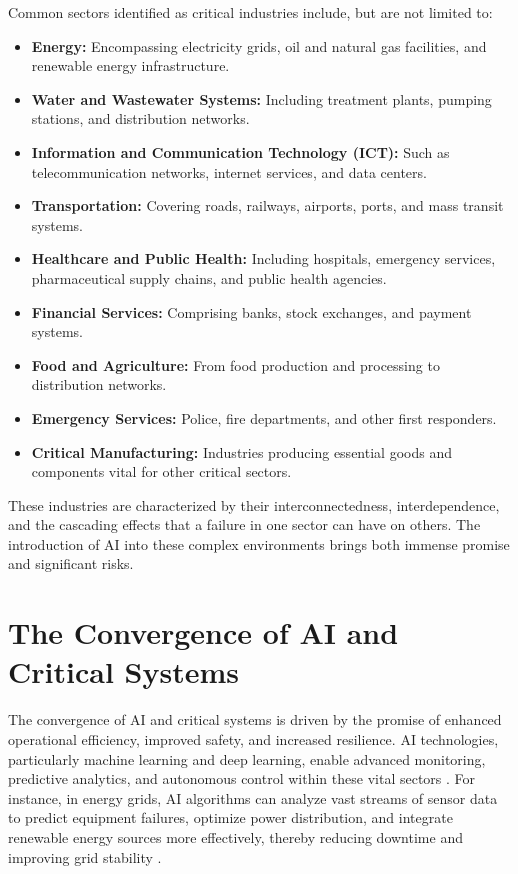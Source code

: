 Common sectors identified as critical industries include, but are not limited to:
\begin{itemize}
    \item \textbf{Energy:} Encompassing electricity grids, oil and natural gas facilities, and renewable energy infrastructure.
    \item \textbf{Water and Wastewater Systems:} Including treatment plants, pumping stations, and distribution networks.
    \item \textbf{Information and Communication Technology (ICT):} Such as telecommunication networks, internet services, and data centers.
    \item \textbf{Transportation:} Covering roads, railways, airports, ports, and mass transit systems.
    \item \textbf{Healthcare and Public Health:} Including hospitals, emergency services, pharmaceutical supply chains, and public health agencies.
    \item \textbf{Financial Services:} Comprising banks, stock exchanges, and payment systems.
    \item \textbf{Food and Agriculture:} From food production and processing to distribution networks.
    \item \textbf{Emergency Services:} Police, fire departments, and other first responders.
    \item \textbf{Critical Manufacturing:} Industries producing essential goods and components vital for other critical sectors.
\end{itemize}

These industries are characterized by their interconnectedness, interdependence, and the cascading effects that a failure in one sector can have on others. The introduction of AI into these complex environments brings both immense promise and significant risks.

\section{The Convergence of AI and Critical Systems}
\label{sec:convergence_of_ai}
The convergence of AI and critical systems is driven by the promise of enhanced operational efficiency, improved safety, and increased resilience. AI technologies, particularly machine learning and deep learning, enable advanced monitoring, predictive analytics, and autonomous control within these vital sectors \parencite{EnergyGov2023}. For instance, in energy grids, AI algorithms can analyze vast streams of sensor data to predict equipment failures, optimize power distribution, and integrate renewable energy sources more effectively, thereby reducing downtime and improving grid stability \parencite{Checkpoint2023}.

